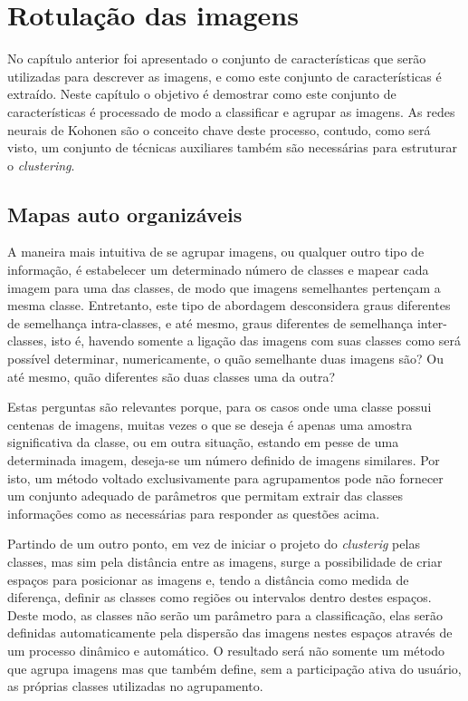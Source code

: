 \chapter{Rotulação das imagens}

No capítulo anterior foi apresentado o conjunto de características que serão
utilizadas para descrever as imagens, e como este conjunto de características é
extraído. Neste capítulo o objetivo é demostrar como este conjunto de
características é processado de modo a classificar e agrupar as imagens. As
redes neurais de Kohonen são o conceito chave deste processo, contudo, como
será visto, um conjunto de técnicas auxiliares também são necessárias para
estruturar o \textit{clustering}.

\section{Mapas auto organizáveis}\label{sec:mapas_aut_organizaveis}

A maneira mais intuitiva de se agrupar imagens, ou qualquer outro tipo de
informação, é estabelecer um determinado número de classes e mapear cada imagem
para uma das classes, de modo que imagens semelhantes pertençam a mesma classe.
Entretanto, este tipo de abordagem desconsidera graus diferentes de semelhança
intra-classes, e até mesmo, graus diferentes de semelhança inter-classes, isto
é, havendo somente a ligação das imagens com suas classes como será possível
determinar, numericamente, o quão semelhante duas imagens são? Ou até mesmo,
quão diferentes são duas classes uma da outra?

Estas perguntas são relevantes porque, para os casos onde uma classe possui
centenas de imagens, muitas vezes o que se deseja é apenas uma amostra
significativa da classe, ou em outra situação, estando em pesse de uma
determinada imagem, deseja-se um número definido de imagens similares. Por isto,
um método voltado exclusivamente para agrupamentos pode não fornecer um conjunto
adequado de parâmetros que permitam extrair das classes informações como as
necessárias para responder as questões acima.

Partindo de um outro ponto, em vez de iniciar o projeto do \textit{clusterig} pelas
classes, mas sim pela distância entre as imagens, surge a possibilidade de criar
espaços para posicionar as imagens e, tendo a distância como medida de
diferença, definir as classes como regiões ou intervalos dentro destes espaços.
Deste modo, as classes não serão um parâmetro para a classificação, elas serão
definidas automaticamente pela dispersão das imagens nestes espaços através de
um processo dinâmico e automático. O resultado será não somente um método que
agrupa imagens mas que também define, sem a participação ativa do usuário, as
próprias classes utilizadas no agrupamento.

